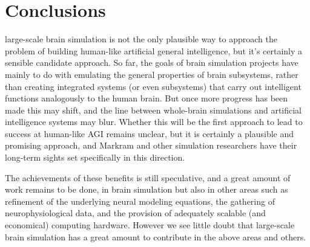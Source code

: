 
\chapter{Conclusions}

large-scale brain simulation is not the only
plausible way to approach the problem of building human-like
artificial general intelligence, but it's certainly a sensible candidate approach. So far, the goals of brain simulation projects have
mainly to do with emulating the general properties of brain
subsystems, rather than creating integrated systems (or even
subsystems) that carry out intelligent functions analogously to
the human brain. But once more progress has been made this may
shift, and the line between whole-brain simulations and artificial
intelligence systems may blur. Whether this will be the first
approach to lead to success at human-like AGI remains unclear,
but it is certainly a plausible and promising approach, and
Markram and other simulation researchers have their long-term
sights set specifically in this direction.

The achievements of these benefits is still speculative, and a
great amount of work remains to be done, in brain simulation but
also in other areas such as refinement of the underlying neural
modeling equations, the gathering of neurophysiological data, and
the provision of adequately scalable (and economical) computing
hardware. However we see little doubt that large-scale brain
simulation has a great amount to contribute in the above areas
and others.
